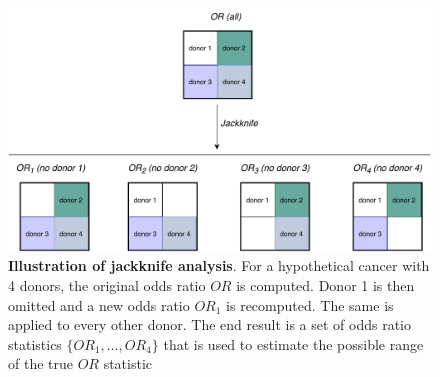 \begin{figure}[h!]
    \centering
    \includegraphics[scale=0.7]{graphics/jackknife_demo.pdf}
    \caption{\textbf{Illustration of jackknife analysis}. For a hypothetical cancer with 4 donors, the original odds ratio $OR$ is computed. Donor 1 is then omitted and a new odds ratio $OR_1$ is recomputed. The same is applied to every other donor. The end result is a set of odds ratio statistics $\{OR_1, \ldots, OR_4\}$ that is used to estimate the possible range of the true $OR$ statistic}
    \label{fig:jackknife_demo}
\end{figure}
